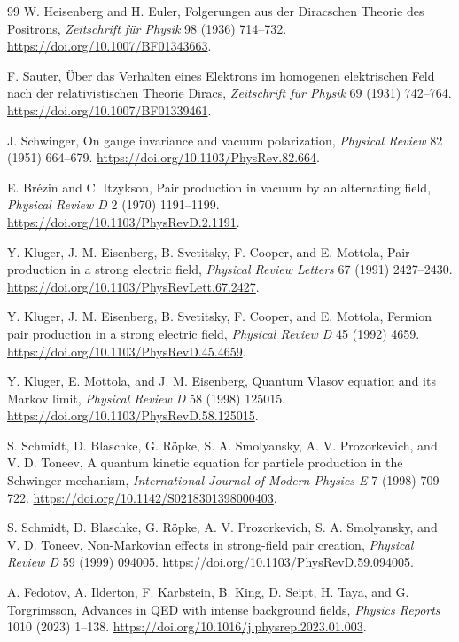 \documentclass[11pt,a4paper]{article}
\begin{document}
\FloatBarrier
\begin{thebibliography}{99}
W. Heisenberg and H. Euler, Folgerungen aus der Diracschen Theorie des Positrons, \textit{Zeitschrift f\"ur Physik} 98 (1936) 714--732. \url{https://doi.org/10.1007/BF01343663}.

F. Sauter, \"Uber das Verhalten eines Elektrons im homogenen elektrischen Feld nach der relativistischen Theorie Diracs, \textit{Zeitschrift f\"ur Physik} 69 (1931) 742--764. \url{https://doi.org/10.1007/BF01339461}.

J. Schwinger, On gauge invariance and vacuum polarization, \textit{Physical Review} 82 (1951) 664--679. \url{https://doi.org/10.1103/PhysRev.82.664}.

E. Br\'ezin and C. Itzykson, Pair production in vacuum by an alternating field, \textit{Physical Review D} 2 (1970) 1191--1199. \url{https://doi.org/10.1103/PhysRevD.2.1191}.

Y. Kluger, J. M. Eisenberg, B. Svetitsky, F. Cooper, and E. Mottola, Pair production in a strong electric field, \textit{Physical Review Letters} 67 (1991) 2427--2430. \url{https://doi.org/10.1103/PhysRevLett.67.2427}.

Y. Kluger, J. M. Eisenberg, B. Svetitsky, F. Cooper, and E. Mottola, Fermion pair production in a strong electric field, \textit{Physical Review D} 45 (1992) 4659. \url{https://doi.org/10.1103/PhysRevD.45.4659}.

Y. Kluger, E. Mottola, and J. M. Eisenberg, Quantum Vlasov equation and its Markov limit, \textit{Physical Review D} 58 (1998) 125015. \url{https://doi.org/10.1103/PhysRevD.58.125015}.

S. Schmidt, D. Blaschke, G. R\"opke, S. A. Smolyansky, A. V. Prozorkevich, and V. D. Toneev, A quantum kinetic equation for particle production in the Schwinger mechanism, \textit{International Journal of Modern Physics E} 7 (1998) 709--722. \url{https://doi.org/10.1142/S0218301398000403}.

S. Schmidt, D. Blaschke, G. R\"opke, A. V. Prozorkevich, S. A. Smolyansky, and V. D. Toneev, Non-Markovian effects in strong-field pair creation, \textit{Physical Review D} 59 (1999) 094005. \url{https://doi.org/10.1103/PhysRevD.59.094005}.

A. Fedotov, A. Ilderton, F. Karbstein, B. King, D. Seipt, H. Taya, and G. Torgrimsson, Advances in QED with intense background fields, \textit{Physics Reports} 1010 (2023) 1--138. \url{https://doi.org/10.1016/j.physrep.2023.01.003}.


\end{thebibliography}
\end{document}
